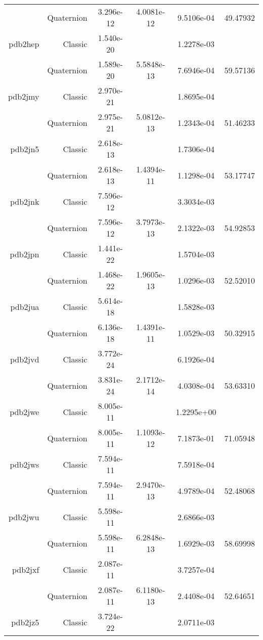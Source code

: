 \begin{xltabular}{\textwidth}{r|rS[table-format=1.3e+2]S[table-format=1.4e+2]S[table-format=1.4e+2]S[table-format=-1.5]}
& Quaternion & 3.296e-12 & 4.0081e-12 & 9.5106e-04 & 49.47932\\  \addlinespace
pdb2hep & Classic & 1.540e-20 &  & 1.2278e-03 & \\
& Quaternion & 1.589e-20 & 5.5848e-13 & 7.6946e-04 & 59.57136\\  \addlinespace
pdb2jmy & Classic & 2.970e-21 &  & 1.8695e-04 & \\
& Quaternion & 2.975e-21 & 5.0812e-13 & 1.2343e-04 & 51.46233\\  \addlinespace
pdb2jn5 & Classic & 2.618e-13 &  & 1.7306e-04 & \\
& Quaternion & 2.618e-13 & 1.4394e-11 & 1.1298e-04 & 53.17747\\  \addlinespace
pdb2jnk & Classic & 7.596e-12 &  & 3.3034e-03 & \\
& Quaternion & 7.596e-12 & 3.7973e-13 & 2.1322e-03 & 54.92853\\  \addlinespace
pdb2jpn & Classic & 1.441e-22 &  & 1.5704e-03 & \\
& Quaternion & 1.468e-22 & 1.9605e-13 & 1.0296e-03 & 52.52010\\  \addlinespace
pdb2jua & Classic & 5.614e-18 &  & 1.5828e-03 & \\
& Quaternion & 6.136e-18 & 1.4391e-11 & 1.0529e-03 & 50.32915\\  \addlinespace
pdb2jvd & Classic & 3.772e-24 &  & 6.1926e-04 & \\
& Quaternion & 3.831e-24 & 2.1712e-14 & 4.0308e-04 & 53.63310\\  \addlinespace
pdb2jwe & Classic & 8.005e-11 &  & 1.2295e+00 & \\
& Quaternion & 8.005e-11 & 1.1093e-12 & 7.1873e-01 & 71.05948\\  \addlinespace
pdb2jws & Classic & 7.594e-11 &  & 7.5918e-04 & \\
& Quaternion & 7.594e-11 & 2.9470e-13 & 4.9789e-04 & 52.48068\\  \addlinespace
pdb2jwu & Classic & 5.598e-11 &  & 2.6866e-03 & \\
& Quaternion & 5.598e-11 & 6.2848e-13 & 1.6929e-03 & 58.69998\\  \addlinespace
pdb2jxf & Classic & 2.087e-11 &  & 3.7257e-04 & \\
& Quaternion & 2.087e-11 & 6.1180e-13 & 2.4408e-04 & 52.64651\\  \addlinespace
pdb2jz5 & Classic & 3.724e-22 &  & 2.0711e-03 & \\

\end{xltabular}
